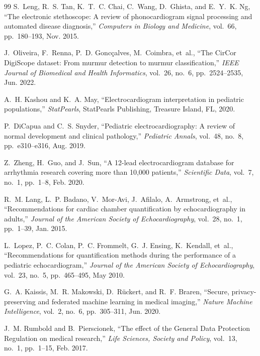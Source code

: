 \documentclass[12pt,a4paper]{amritareport}
\begin{document}
\begin{thebibliography}{99}
S.~Leng, R.~S. Tan, K.~T.~C. Chai, C.~Wang, D.~Ghista, and E.~Y.~K. Ng,
``The electronic stethoscope: A review of phonocardiogram signal processing and automated disease diagnosis,''
\textit{Computers in Biology and Medicine}, vol.~66, pp.~180--193, Nov. 2015.

J.~Oliveira, F.~Renna, P.~D. Gonc{\c{c}}alves, M.~Coimbra, et~al.,
``The CirCor DigiScope dataset: From murmur detection to murmur classification,''
\textit{IEEE Journal of Biomedical and Health Informatics}, vol.~26, no.~6, pp.~2524--2535, Jun. 2022.

A.~H. Kashou and K.~A. May,
``Electrocardiogram interpretation in pediatric populations,''
\textit{StatPearls}, StatPearls Publishing, Treasure Island, FL, 2020.

P.~DiCapua and C.~S. Snyder,
``Pediatric electrocardiography: A review of normal development and clinical pathology,''
\textit{Pediatric Annals}, vol.~48, no.~8, pp.~e310--e316, Aug. 2019.

Z.~Zheng, H.~Guo, and J.~Sun,
``A 12-lead electrocardiogram database for arrhythmia research covering more than 10,000 patients,''
\textit{Scientific Data}, vol.~7, no.~1, pp.~1--8, Feb. 2020.

R.~M. Lang, L.~P. Badano, V.~Mor-Avi, J.~Afilalo, A.~Armstrong, et~al.,
``Recommendations for cardiac chamber quantification by echocardiography in adults,''
\textit{Journal of the American Society of Echocardiography}, vol.~28, no.~1, pp.~1--39, Jan. 2015.

L.~Lopez, P.~C. Colan, P.~C. Frommelt, G.~J. Ensing, K.~Kendall, et~al.,
``Recommendations for quantification methods during the performance of a pediatric echocardiogram,''
\textit{Journal of the American Society of Echocardiography}, vol.~23, no.~5, pp.~465--495, May 2010.

G.~A. Kaissis, M.~R. Makowski, D.~R{\"u}ckert, and R.~F. Braren,
``Secure, privacy-preserving and federated machine learning in medical imaging,''
\textit{Nature Machine Intelligence}, vol.~2, no.~6, pp.~305--311, Jun. 2020.

J.~M. Rumbold and B.~Pierscionek,
``The effect of the General Data Protection Regulation on medical research,''
\textit{Life Sciences, Society and Policy}, vol.~13, no.~1, pp.~1--15, Feb. 2017.


\end{thebibliography}
\end{document}
